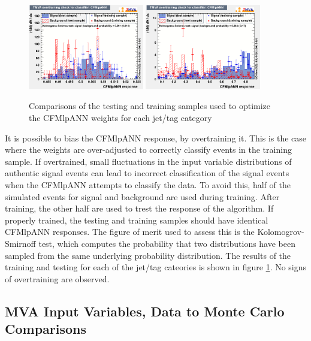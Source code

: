 \begin{figure}[hbtp]
\begin{center}
   \includegraphics[width=0.45\textwidth]{Figures/Analysis_1_Diagrams/overtrain_CFMlpANN_5j4ormoret.png}
   \includegraphics[width=0.45\textwidth]{Figures/Analysis_1_Diagrams/overtrain_CFMlpANN_6ormorej4ormoret.png}
      \caption{Comparisons of the testing and training samples used to
      optimize the CFMlpANN weights for each jet/tag category}
   \label{fig:ann_testTrain}
 \end{center}
\end{figure}

\par It is possible to bias the CFMlpANN response, by overtraining
it.  This is the case where the weights are over-adjusted to correctly
classify events in the training sample.  If overtrained, small
fluctuations in the input variable distributions of authentic signal
events can lead to incorrect classification of the signal events when
the CFMlpANN attempts to classify the data.  To avoid this, half of
the simulated events for \ttH signal and \ttjets background are used
during training.  After training, the other half are used to trest the
response of the algorithm.  If properly trained, the testing and
training samples should have identical CFMlpANN responses.  The figure
of merit used to assess this is the Kolomogrov-Smirnoff test, which
computes the probability that two distributions have been sampled from
the same underlying probability distribution.  The results of the
training and testing for each of the jet/tag cateories is shown in
figure \ref{fig:ann_testTrain}.  No signs of overtraining are observed.


\subsection{MVA Input Variables, Data to Monte Carlo Comparisons}
\label{mva_input_vars_data_to_mc_overview}


